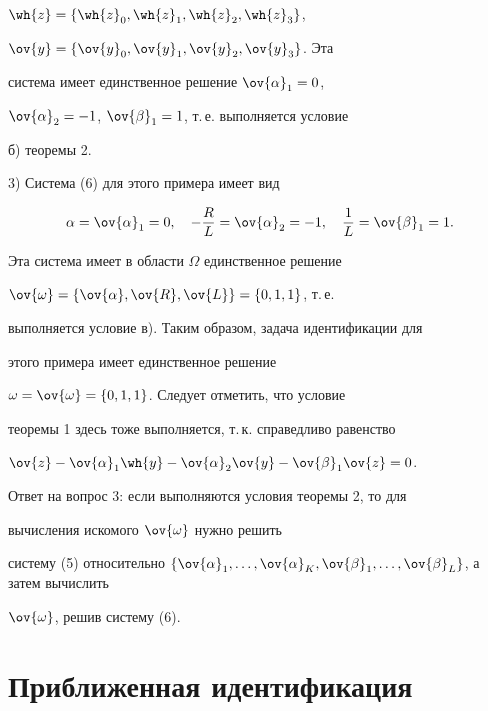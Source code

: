 \begin{exam}
$\wh{z}=\{\wh{z}_0, \wh{z}_1, \wh{z}_2, \wh{z}_3\}$,


$\ov{y}=\{\ov{y}_0, \ov{y}_1, \ov{y}_2, \ov{y}_3\}$. Эта


система имеет единственное решение $\ov{\alpha}_1=0$,


$\ov{\alpha}_2=-1$, $\ov{\beta}_1=1$, т.\,е. выполняется условие


б) теоремы 2.





3) Система (6) для этого примера имеет вид


$$


\alpha=\ov{\alpha}_1=0,\quad


-\frac{R}{L}=\ov{\alpha}_2=-1,\quad


\frac{1}{L}=\ov{\beta}_1=1.


$$


Эта система имеет в области $\Omega$ единственное решение


$\ov{\omega}=\{\ov{\alpha},\ov{R},\ov{L}\}=\{0,1,1\}$, т.\,е.


выполняется условие в). Таким образом, задача идентификации для


этого примера имеет единственное решение


$\omega=\ov{\omega}=\{0,1,1\}$. Следует отметить, что условие


теоремы 1 здесь тоже выполняется, т.\,к. справедливо равенство


$\ov{z}-\ov{\alpha}_1\wh{y}-


\ov{\alpha}_2\ov{y}-\ov{\beta}_1\ov{z}=0$.





Ответ на вопрос 3: если выполняются условия теоремы 2, то для


вычисления искомого $\ov{\omega}$ нужно решить


систему (5) относительно $\{\ov{\alpha}_1,\dotsc,\ov{\alpha}_K,


\ov{\beta}_1,\dotsc,\ov{\beta}_L\}$, а затем вычислить


$\ov{\omega}$, решив систему (6).


\end{exam}








\section{Приближенная идентификация}








